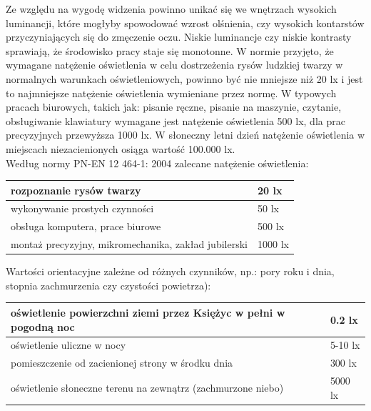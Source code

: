 \documentclass[a4paper,12pt]{article}
\begin{document}
	Ze względu na wygodę widzenia powinno unikać się we wnętrzach wysokich luminancji, które mogłyby spowodować wzrost olśnienia, czy wysokich kontarstów przyczyniających się do zmęczenie oczu. Niskie luminancje czy niskie kontrasty sprawiają, że środowisko pracy staje się monotonne.
	\newpage
	W normie przyjęto, że wymagane natężenie oświetlenia w celu dostrzeżenia rysów ludzkiej twarzy w normalnych warunkach oświetleniowych, powinno być nie mniejsze niż 20 lx i jest to najmniejsze natężenie oświetlenia wymieniane przez normę. W typowych pracach biurowych, takich jak: pisanie ręczne, pisanie na maszynie, 				czytanie, obsługiwanie klawiatury wymagane jest natężenie oświetlenia 500 lx, dla prac precyzyjnych przewyższa 1000 lx. W słoneczny letni dzień natężenie oświetlenia w miejscach niezacienionych osiąga wartość 100.000 lx.\\

	\noindent Według normy PN-EN 12 464-1: 2004 zalecane natężenie oświetlenia:
	\begin{center}
		\begin{table}[!h]
        		\centering     
			\begin{tabular}{|p{}|p{}|}
				\hline 
				rozpoznanie rysów twarzy & 20 lx \\
				\hline 
				wykonywanie prostych czynności  & 50 lx \\
				\hline 
				obsługa komputera, prace biurowe & 500 lx \\
				\hline 
				montaż precyzyjny, mikromechanika, zakład jubilerski   & 1000 lx \\
 				\hline
			\end{tabular}     
       		 \end{table}
	\end{center}
	Wartości orientacyjne zależne od różnych czynników, np.: pory roku i dnia, stopnia zachmurzenia czy czystości powietrza):
	\begin{center}
		\begin{table}[!h]
        		\centering     
			\begin{tabular}{|p{}|p{}|}
				\hline 
				 oświetlenie powierzchni ziemi przez Księżyc w pełni w pogodną noc & 0.2 lx \\
				\hline 
				oświetlenie uliczne w nocy  & 5-10 lx \\
				\hline 
				pomieszczenie od zacienionej strony w środku dnia & 300 lx \\
				\hline 
				oświetlenie słoneczne terenu na zewnątrz (zachmurzone niebo)   & 5000 lx \\
 				\hline
			\end{tabular}     
       		 \end{table}
	\end{center}
\end{document}
